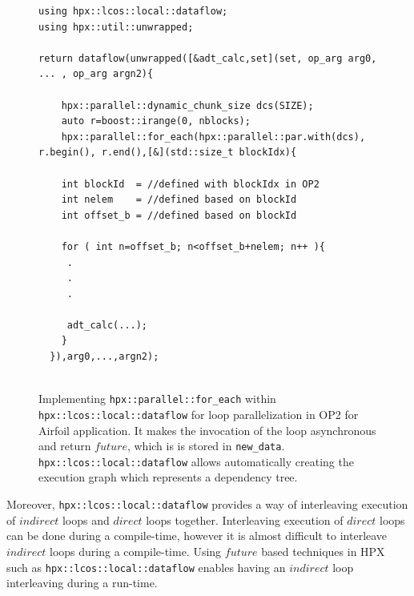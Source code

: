 \documentclass[conference]{IEEEtran}
\begin{document}
\begin{figure}
    \begin{lstlisting}    
using hpx::lcos::local::dataflow;
using hpx::util::unwrapped;    

return dataflow(unwrapped([&adt_calc,set](set, op_arg arg0, ... , op_arg argn2){

    hpx::parallel::dynamic_chunk_size dcs(SIZE);
    auto r=boost::irange(0, nblocks);
    hpx::parallel::for_each(hpx::parallel::par.with(dcs), r.begin(), r.end(),[&](std::size_t blockIdx){
  
    int blockId  = //defined with blockIdx in OP2
    int nelem    = //defined based on blockId 
    int offset_b = //defined based on blockId
        
    for ( int n=offset_b; n<offset_b+nelem; n++ ){
     .
     .
     .

     adt_calc(...);
    }
  }),arg0,...,argn2);
  
    \end{lstlisting}
    \caption{\small{Implementing \texttt{hpx::parallel::for\_each} within \texttt{hpx::lcos::local::dataflow} for loop parallelization in OP2 for Airfoil application. It makes the invocation of the loop asynchronous and return $future$, which is is stored in \texttt{new\_data}. \texttt{hpx::lcos::local::dataflow} allows automatically creating the execution graph which represents a dependency tree.}}
    \label{l3b}
\end{figure}





Moreover, \texttt{hpx::lcos::local::dataflow} provides a way of interleaving execution of $indirect$ loops and $direct$ loops together. Interleaving execution of $direct$ loops can be done during a compile-time, however it is almost difficult to interleave $indirect$ loops during a compile-time. Using $future$ based techniques in HPX such as \texttt{hpx::lcos::local::dataflow} enables having an $indirect$ loop interleaving during a run-time.  

\end{document}
